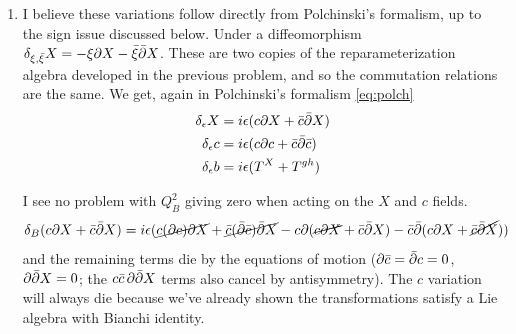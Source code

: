 \documentclass[11pt, class=article, crop=false]{standalone}
\begin{document}
\begin{enumerate}
	  \[
	  	Q_B = p_X \delta_B X + p_b \delta_B b = - c \dot X^2 - i c i (- \frac12 \dot X + \frac12 m^2 - \dot b c) = - c \frac12 \dot X + \frac12 m^2 = c \frac12 (p^2 + m^2) = c H.
	  \]
	  Clearly $Q_B^2 = 0$.
	  As before, the ghosts generate a two-state system. Our set of states is given by $\ket{k^\mu, \uparrow}, \ket{k^\mu, \downarrow}$. Following convention, $c$ raises and $b$ lowers. $Q_B \ket{k, \downarrow} = \frac12 (k^2 + m^2) \ket{k, \uparrow}$ so all states of the form $\ket{k, \uparrow}$ with $k^2 + m^2 \neq 0$ are BRST exact. Similarly all states $\ket{k, \uparrow}$ are BRST closed along with all states of the form $\ket{k, \downarrow}$ with $k^2 + m^2 = 0$. So the closed states that are not exact are $\ket{k, \downarrow}$, $\ket{k, \uparrow}$ with $k^2 + m^2 = 0$. We take only the states with $b \ket{\psi} = 0$. The reason is that all states $\ket{k, \uparrow}$ are physical, and so we would need amplitudes between such states to be proportional to $\delta(k^2 + m^2)$ in order for the states to decouple, but \emph{amplitudes} cannot have such extreme singularities \textbf{Don't understand this. Appreciate it, and its relation to Siegel gauge.}.
	  
	  \item I believe these variations follow directly from Polchinski's formalism, up to the sign issue discussed below. Under a diffeomorphism $\delta_{\xi, \bar \xi} X = -\xi \partial X - \bar \xi \bar {\partial} X$. These are two copies of the reparameterization algebra developed in the previous problem, and so the commutation relations are the same. We get, again in Polchinski's formalism \eqref{eq:polch}
	  \begin{equation}
	  	\begin{aligned}
	  		\delta_{\epsilon} X &= i \epsilon (c \partial X + \bar c \bar {\partial} X)\\
			\delta_\epsilon   c &= i \epsilon (c \partial c + \bar c \bar \partial \bar c)\\
			\delta_\epsilon   b &= i \epsilon (T^X + T^{gh})
	  	\end{aligned}
	  \end{equation}
	  
	  I see no problem with $Q^2_B$ giving zero when acting on the $X$ and $c$ fields.
	  \[
	  	\delta_B (c \partial X+ \bar c \bar {\partial} X ) = i \epsilon (\cancel {c (\partial c) \partial X} + \cancel{\bar c (\bar {\partial} \bar c) \bar {\partial} X} - c \partial (\cancel{c \partial X} + \bar c \bar {\partial} X) -  \bar c \bar {\partial} (c \partial X + \cancel{\bar c \bar {\partial} X}) )
	  \]
	  and the remaining terms die by the equations of motion ($\partial \bar c = \bar {\partial} c = 0$, $\partial \bar {\partial} X = 0$; the $c \bar c\, \partial \bar {\partial} X$ terms also cancel by antisymmetry). The $c$ variation will always die because we've already shown the transformations satisfy a Lie algebra with Bianchi identity. 
	  

\end{enumerate}
\end{document}
